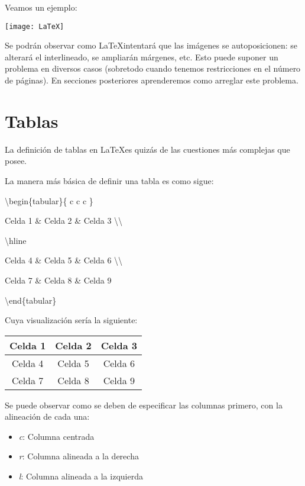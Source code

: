 Veamos un ejemplo: %

\texttt{[image: LaTeX]}

Se podrán observar como \LaTeX intentará que las imágenes se autoposicionen: se alterará el interlineado, se ampliarán márgenes, etc. Esto puede suponer un problema en diversos casos (sobretodo cuando tenemos restricciones en el número de páginas). En secciones posteriores aprenderemos como arreglar este problema.

\section{Tablas}

La definición de tablas en \LaTeX es quizás de las cuestiones más complejas que posee.

La manera más básica de definir una tabla es como sigue:

\textbackslash begin\{tabular\}\{ c \vline c \vline c \}

 Celda 1 \& Celda 2 \& Celda 3 \textbackslash\textbackslash
 
 \textbackslash hline
 
 Celda 4 \& Celda 5 \& Celda 6 \textbackslash\textbackslash
 
 Celda 7 \& Celda 8 \& Celda 9
  
\textbackslash end\{tabular\}

Cuya visualización sería la siguiente: %

\begin{tabular}{ c|c|c }
 Celda 1 & Celda 2 & Celda 3 \\
 \hline
 Celda 4 & Celda 5 & Celda 6 \\  
 Celda 7 & Celda 8 & Celda 9    
\end{tabular}

Se puede observar como se deben de especificar las columnas primero, con la alineación de cada una:

\begin{itemize}
	\item \emph{c}: Columna centrada
	\item \emph{r}: Columna alineada a la derecha
	\item \emph{l}: Columna alineada a la izquierda
\end{itemize}

